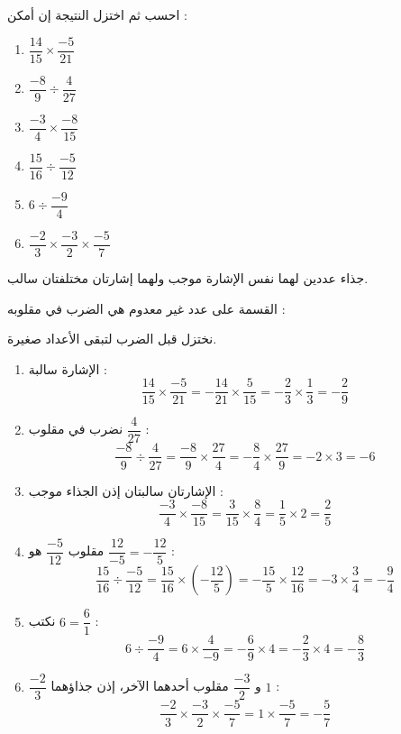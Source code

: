 \documentclass[12pt,a4paper]{article}
\begin{document}
\begin{corr}[title={الجذاء وحاصل القسمة}, stars=2, source={Axiomaths}]
احسب ثم اختزل النتيجة إن أمكن :
\begin{enumerate}
  \item $\dfrac{14}{15}\times\dfrac{-5}{21}$
  \item $\dfrac{-8}{9}\div\dfrac{4}{27}$
  \item $\dfrac{-3}{4}\times\dfrac{-8}{15}$
  \item $\dfrac{15}{16}\div\dfrac{-5}{12}$
  \item $6\div\dfrac{-9}{4}$
  \item $\dfrac{-2}{3}\times\dfrac{-3}{2}\times\dfrac{-5}{7}$
\end{enumerate}
\axsol
\begin{prop}[الضرب]
 \qquad جذاء عددين لهما نفس الإشارة موجب ولهما إشارتان مختلفتان سالب.
\end{prop}
\begin{prop}[القسمة]
القسمة على عدد غير معدوم هي الضرب في مقلوبه : 
\end{prop}
نختزل قبل الضرب لتبقى الأعداد صغيرة.
\begin{enumerate}[itemsep=14pt]
  \item الإشارة سالبة :
  \[\dfrac{14}{15}\times\dfrac{-5}{21}=-\dfrac{14}{21}\times\dfrac{5}{15}=-\dfrac{2}{3}\times\dfrac{1}{3}=-\dfrac{2}{9}\]
  \item نضرب في مقلوب $\dfrac{4}{27}$ :
  \[\dfrac{-8}{9}\div\dfrac{4}{27}=\dfrac{-8}{9}\times\dfrac{27}{4}=-\dfrac{8}{4}\times\dfrac{27}{9}=-2\times3=-6\]
  \item الإشارتان سالبتان إذن الجذاء موجب :
  \[\dfrac{-3}{4}\times\dfrac{-8}{15}=\dfrac{3}{15}\times\dfrac{8}{4}=\dfrac{1}{5}\times2=\dfrac{2}{5}\]
  \item مقلوب $\dfrac{-5}{12}$ هو $\dfrac{12}{-5}=-\dfrac{12}{5}$ :
  \[\dfrac{15}{16}\div\dfrac{-5}{12}=\dfrac{15}{16}\times\left(-\dfrac{12}{5}\right)=-\dfrac{15}{5}\times\dfrac{12}{16}=-3\times\dfrac{3}{4}=-\dfrac{9}{4}\]
  \item نكتب $6=\dfrac{6}{1}$ :
  \[6\div\dfrac{-9}{4}=6\times\dfrac{4}{-9}=-\dfrac{6}{9}\times4=-\dfrac{2}{3}\times4=-\dfrac{8}{3}\]
  \item $\dfrac{-2}{3}$ و $\dfrac{-3}{2}$ مقلوب أحدهما الآخر، إذن جذاؤهما $1$ :
  \[\dfrac{-2}{3}\times\dfrac{-3}{2}\times\dfrac{-5}{7}=1\times\dfrac{-5}{7}=-\dfrac{5}{7}\]
\end{enumerate}
\end{corr}
\end{document}
